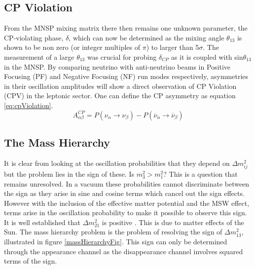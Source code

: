 \subsection{CP Violation}
From the MNSP mixing matrix there then remains one unknown parameter, the CP-violating phase, $\delta$, which can now be determined as the mixing angle $\theta_{13}$ is shown to be non zero (or integer multiples of $\pi$) to larger than 5$\sigma$. The measurement of a large $\theta_{13}$ was crucial for probing $\delta_{CP}$ as it is coupled with sin$\theta_{13}$ in the MNSP. By comparing neutrino with anti-neutrino beams in Positive Focusing (PF) and Negative Focusing (NF) run modes respectively, asymmetries in their oscillation amplitudes will show a direct observation of CP Violation (CPV) in the leptonic sector. One can define the CP asymmetry as equation \ref{eq:cpViolation}.
\begin{equation}
	A^{CP}_{\alpha\beta} = P(\nu_{\alpha} \rightarrow \nu_{\beta}) - P(\overline{\nu}_{\alpha} \rightarrow \overline{\nu}_{\beta})
	\label{eq:cpViolation}
\end{equation}

\subsection{The Mass Hierarchy}
It is clear from looking at the oscillation probabilities that they depend on $\Delta m^{2}_{ij}$ but the problem lies in the sign of these. Is $m^{2}_{3} > m^{2}_{1}$? This is a question that remains unresolved. In a vacuum these probabilities cannot discriminate between the sign as they arise in sine and cosine terms which cancel out the sign effects. However with the inclusion of the effective matter potential and the MSW effect, terms arise in the oscillation probability to make it possible to observe this sign. It is well established that $\Delta m^{2}_{21}$ is positive \cite{solarNeutrinoMassDifference}. This is due to matter effects of the Sun. 
The mass hierarchy problem is the problem of resolving  the sign of $\Delta m^{2}_{13}$, illustrated in figure \ref{massHierarchyFig}. This sign can only be determined through the appearance channel as the disappearance channel involves squared terms of the sign. 

